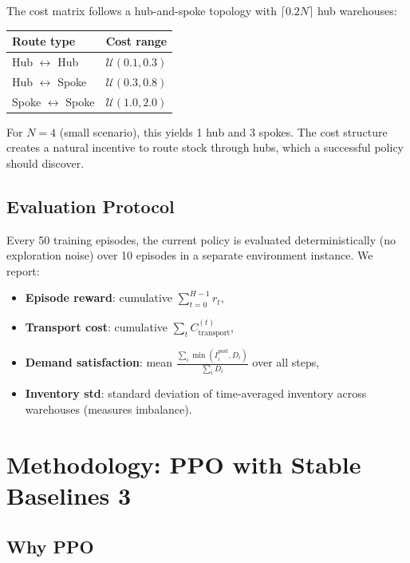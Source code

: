 \documentclass[11pt]{article}
\begin{document}
The cost matrix follows a hub-and-spoke topology with $\lceil 0.2 N \rceil$ hub warehouses:
\begin{center}
\begin{tabular}{lc}
\toprule
Route type & Cost range \\
\midrule
Hub $\leftrightarrow$ Hub & $\mathcal{U}(0.1, 0.3)$ \\
Hub $\leftrightarrow$ Spoke & $\mathcal{U}(0.3, 0.8)$ \\
Spoke $\leftrightarrow$ Spoke & $\mathcal{U}(1.0, 2.0)$ \\
\bottomrule
\end{tabular}
\end{center}
For $N=4$ (small scenario), this yields 1 hub and 3 spokes. The cost structure creates a natural incentive to route stock through hubs, which a successful policy should discover.

\subsection{Evaluation Protocol}

Every 50 training episodes, the current policy is evaluated deterministically (no exploration noise) over 10 episodes in a separate environment instance. We report:
\begin{itemize}[nosep]
    \item \textbf{Episode reward}: cumulative $\sum_{t=0}^{H-1} r_t$,
    \item \textbf{Transport cost}: cumulative $\sum_t C_{\text{transport}}^{(t)}$,
    \item \textbf{Demand satisfaction}: mean $\frac{\sum_i \min(I_i^{\text{post}}, D_i)}{\sum_i D_i}$ over all steps,
    \item \textbf{Inventory std}: standard deviation of time-averaged inventory across warehouses (measures imbalance).
\end{itemize}

\section{Methodology: PPO with Stable Baselines 3}

\subsection{Why PPO}
\end{document}

